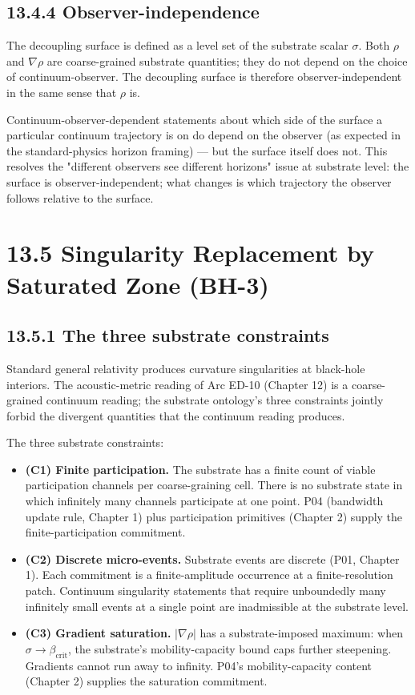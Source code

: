 \documentclass[11pt]{book}
\begin{document}
\subsection{13.4.4 Observer-independence}

The decoupling surface is defined as a level set of the substrate scalar $\sigma$. Both $\rho$ and $\nabla\rho$ are coarse-grained substrate quantities; they do not depend on the choice of continuum-observer. The decoupling surface is therefore observer-independent in the same sense that $\rho$ is.

Continuum-observer-dependent statements about which side of the surface a particular continuum trajectory is on do depend on the observer (as expected in the standard-physics horizon framing) — but the surface itself does not. This resolves the "different observers see different horizons" issue at substrate level: the surface is observer-independent; what changes is which trajectory the observer follows relative to the surface.

\section{13.5 Singularity Replacement by Saturated Zone (BH-3)}

\subsection{13.5.1 The three substrate constraints}

Standard general relativity produces curvature singularities at black-hole interiors. The acoustic-metric reading of Arc ED-10 (Chapter 12) is a coarse-grained continuum reading; the substrate ontology's three constraints jointly forbid the divergent quantities that the continuum reading produces.

The three substrate constraints:

\begin{itemize}
\item \textbf{(C1) Finite participation.} The substrate has a finite count of viable participation channels per coarse-graining cell. There is no substrate state in which infinitely many channels participate at one point. P04 (bandwidth update rule, Chapter 1) plus participation primitives (Chapter 2) supply the finite-participation commitment.
\item \textbf{(C2) Discrete micro-events.} Substrate events are discrete (P01, Chapter 1). Each commitment is a finite-amplitude occurrence at a finite-resolution patch. Continuum singularity statements that require unboundedly many infinitely small events at a single point are inadmissible at the substrate level.
\item \textbf{(C3) Gradient saturation.} $|\nabla\rho|$ has a substrate-imposed maximum: when $\sigma \to \beta_\mathrm{crit}$, the substrate's mobility-capacity bound caps further steepening. Gradients cannot run away to infinity. P04's mobility-capacity content (Chapter 2) supplies the saturation commitment.
\end{itemize}
\end{document}
